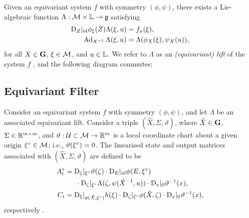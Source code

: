 \documentclass{article}
\begin{document}

Given an equivariant system $f$ with symmetry $(\phi, \psi)$, there exists a Lie-algebraic function $\Lambda : \mathcal{M} \times \mathbb{L} \to \mathfrak{g}$ satisfying
\begin{align}
    \mathrm{D}_{Z} |_{\mathrm{id}} \phi_\xi(Z) \Lambda(\xi, u) &= f_u(\xi), \\
    \operatorname{Ad}_{X^{-1}} \Lambda(\xi, u) &= \Lambda(\phi_X(\xi), \psi_X(u)),
\end{align}
for all $X \in \mathbf{G}$, $\xi \in \mathcal{M}$, and $u \in \mathbb{L}$.
We refer to $\Lambda$ as an \emph{(equivariant) lift} of the system $f$ \citep{mahony2020equivariant}, and the following diagram commutes;

\subsection{Equivariant Filter}

Consider an equivariant system $f$ with symmetry $(\phi, \psi)$, and let $\Lambda$ be an associated equivariant lift.
Consider a triple $(\hat{X}, \Sigma, \vartheta)$, where $\hat{X} \in \mathbf{G}$, $\Sigma \in \mathbb{R}^{m \times m}$, and $\vartheta : \mathcal{U} \subset \mathcal{M} \to \mathbb{R}^m$ is a local coordinate chart about a given origin ${\xi}^\circ \in \mathcal{M}$; i.e., $\vartheta({\xi}^\circ) = 0$.
The linearised state and output matrices associated with $(\hat{X}, \Sigma, \vartheta)$ are defined to be
\begin{align}
    {A}^\circ_t
    &= \mathrm{D}_{\zeta}|_{{\xi}^\circ} \vartheta(\zeta) \cdot \mathrm{D}_E |_{\mathrm{id}} \phi(E, {\xi}^\circ)
    \notag \\ &\phantom{==}
     \cdot \mathrm{D}_\zeta |_{{\xi}^\circ} \Lambda(\zeta, \psi(\hat{X}^{-1}, u)) \cdot \mathrm{D}_x |_0 \vartheta^{-1} (x), \\
    C_t
    &= \mathrm{D}_\xi |_{\phi(\hat{X}, {\xi}^\circ)} h(\xi) \cdot \mathrm{D}_{\zeta}|_{{\xi}^\circ} \phi(\hat{X}, \zeta) \cdot \mathrm{D}_x |_0 \vartheta^{-1} (x),
\end{align}
respectively \citep{van2020equivariant}.
\end{document}
